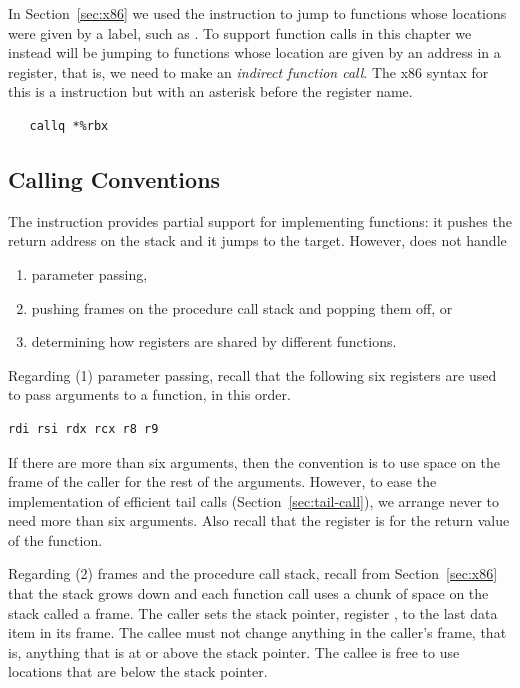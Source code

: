 \documentclass[7x10,nocrop]{TimesAPriori_MIT}%
\begin{document}
In Section~\ref{sec:x86} we used the  instruction to jump
to functions whose locations were given by a label, such as
. To support function calls in this chapter we instead
will be jumping to functions whose location are given by an address in
a register, that is, we need to make an \emph{indirect function
call}. The x86 syntax for this is a  instruction but with
an asterisk before the register name.
\begin{lstlisting}
   callq *%rbx
\end{lstlisting}


\subsection{Calling Conventions}


The  instruction provides partial support for implementing
functions: it pushes the return address on the stack and it jumps to
the target. However,  does not handle
\begin{enumerate}
\item parameter passing,
\item pushing frames on the procedure call stack and popping them off,
  or
\item determining how registers are shared by different functions.
\end{enumerate}

Regarding (1) parameter passing, recall that the following six
registers are used to pass arguments to a function, in this order.
\begin{lstlisting}
rdi rsi rdx rcx r8 r9
\end{lstlisting}
If there are
more than six arguments, then the convention is to use space on the
frame of the caller for the rest of the arguments. However, to ease
the implementation of efficient tail calls
(Section~\ref{sec:tail-call}), we arrange never to need more than six
arguments.
%
Also recall that the register  is for the return value of
the function.


Regarding (2) frames  and the procedure call
stack,  recall from
Section~\ref{sec:x86} that the stack grows down and each function call
uses a chunk of space on the stack called a frame. The caller sets the
stack pointer, register , to the last data item in its
frame. The callee must not change anything in the caller's frame, that
is, anything that is at or above the stack pointer. The callee is free
to use locations that are below the stack pointer.
\end{document}
